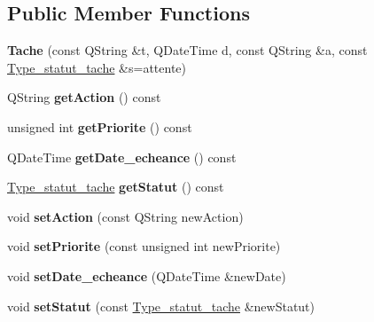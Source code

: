 \subsection*{Public Member Functions}
\begin{DoxyCompactItemize}
\item 
\mbox{\label{class_tache_aff51aaa66ab5616767b8bcb8ba6efb66}} 
{\bfseries Tache} (const Q\+String \&t, Q\+Date\+Time d, const Q\+String \&a, const \hyperlink{tache_8h_addeb79f2c3a0b32730bfe5fe5eb962a7}{Type\+\_\+statut\+\_\+tache} \&s=attente)
\item 
\mbox{\label{class_tache_aafda12978303cd10a514031bdc0bce0c}} 
Q\+String {\bfseries get\+Action} () const
\item 
\mbox{\label{class_tache_ad7f5a2ad90ada488f24f6d110e962d93}} 
unsigned int {\bfseries get\+Priorite} () const
\item 
\mbox{\label{class_tache_a7ea3d62ae653087aca773a60572776e1}} 
Q\+Date\+Time {\bfseries get\+Date\+\_\+echeance} () const
\item 
\mbox{\label{class_tache_a85315e9a77532eaee87dbda30d3caa7c}} 
\hyperlink{tache_8h_addeb79f2c3a0b32730bfe5fe5eb962a7}{Type\+\_\+statut\+\_\+tache} {\bfseries get\+Statut} () const
\item 
\mbox{\label{class_tache_aec909e1855f0553610f191c395412367}} 
void {\bfseries set\+Action} (const Q\+String new\+Action)
\item 
\mbox{\label{class_tache_a1fa817dc840ff1c43bd6dba95ed14482}} 
void {\bfseries set\+Priorite} (const unsigned int new\+Priorite)
\item 
\mbox{\label{class_tache_a01326a5425dee88e3fb727ab9c823a7f}} 
void {\bfseries set\+Date\+\_\+echeance} (Q\+Date\+Time \&new\+Date)
\item 
\mbox{\label{class_tache_a323fc789b8e715472f0947e74213b859}} 
void {\bfseries set\+Statut} (const \hyperlink{tache_8h_addeb79f2c3a0b32730bfe5fe5eb962a7}{Type\+\_\+statut\+\_\+tache} \&new\+Statut)
\end{DoxyCompactItemize}


